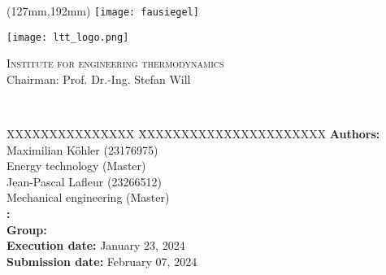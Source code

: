 \begin{titlepage}
	\thispagestyle{empty}

	\begin{textblock*}{\textwidth}(127mm,192mm)
	\texttt{[image: fausiegel]}
	\end{textblock*}

	\begin{minipage}[]{47mm}
		\texttt{[image: ltt\_logo.png]}
	\end{minipage}
	\begin{minipage}[]{.7\textwidth}
		\raggedleft
		\textsc{Institute for engineering thermodynamics}\\ %
		Chairman: Prof. Dr.-Ing. Stefan Will
	\end{minipage}
	
	\vspace{51mm}
	
	{\centering
	
	\large{\arbeit} \\	
	\Large{\textbf{\titel}}
	
	\par}
	
	\vfill
	
	{\raggedright
	\begin{tabbing}
	XXXXXXXXXXXXXXX \= XXXXXXXXXXXXXXXXXXXXXX \kill
		\textbf{Authors:} 			\> Maximilian Köhler (23176975) \\	
									\> Energy technology (Master) \\[12pt]
									\> Jean-Pascal Lafleur (23266512) \\
									\> Mechanical engineering (Master) \\[12pt]
		\textbf{\langdbbetreuer:}	\> \betreuer 						\\[6pt]
		\textbf{Group:}												\\[12pt]
		\textbf{Execution date:}	\> January 23, 2024 			\\[12pt]
		\textbf{Submission date:}	\> February 07, 2024															
	\end{tabbing}
	\par}
\end{titlepage}
